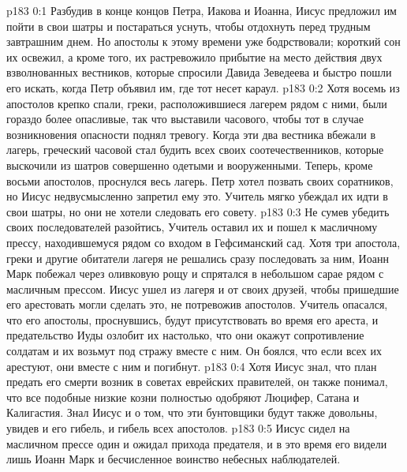 \author{Комиссия срединников}
\vs p183 0:1 Разбудив в конце концов Петра, Иакова и Иоанна, Иисус предложил им пойти в свои шатры и постараться уснуть, чтобы отдохнуть перед трудным завтрашним днем. Но апостолы к этому времени уже бодрствовали; короткий сон их освежил, а кроме того, их растревожило прибытие на место действия двух взволнованных вестников, которые спросили Давида Зеведеева и быстро пошли его искать, когда Петр объявил им, где тот несет караул.
\vs p183 0:2 Хотя восемь из апостолов крепко спали, греки, расположившиеся лагерем рядом с ними, были гораздо более опасливые, так что выставили часового, чтобы тот в случае возникновения опасности поднял тревогу. Когда эти два вестника вбежали в лагерь, греческий часовой стал будить всех своих соотечественников, которые выскочили из шатров совершенно одетыми и вооруженными. Теперь, кроме восьми апостолов, проснулся весь лагерь. Петр хотел позвать своих соратников, но Иисус недвусмысленно запретил ему это. Учитель мягко убеждал их идти в свои шатры, но они не хотели следовать его совету.
\vs p183 0:3 Не сумев убедить своих последователей разойтись, Учитель оставил их и пошел к масличному прессу, находившемуся рядом со входом в Гефсиманский сад. Хотя три апостола, греки и другие обитатели лагеря не решались сразу последовать за ним, Иоанн Марк побежал через оливковую рощу и спрятался в небольшом сарае рядом с масличным прессом. Иисус ушел из лагеря и от своих друзей, чтобы пришедшие его арестовать могли сделать это, не потревожив апостолов. Учитель опасался, что его апостолы, проснувшись, будут присутствовать во время его ареста, и предательство Иуды озлобит их настолько, что они окажут сопротивление солдатам и их возьмут под стражу вместе с ним. Он боялся, что если всех их арестуют, они вместе с ним и погибнут.
\vs p183 0:4 Хотя Иисус знал, что план предать его смерти возник в советах еврейских правителей, он также понимал, что все подобные низкие козни полностью одобряют Люцифер, Сатана и Калигастия. Знал Иисус и о том, что эти бунтовщики будут также довольны, увидев и его гибель, и гибель всех апостолов.
\vs p183 0:5 Иисус сидел на масличном прессе один и ожидал прихода предателя, и в это время его видели лишь Иоанн Марк и бесчисленное воинство небесных наблюдателей.
